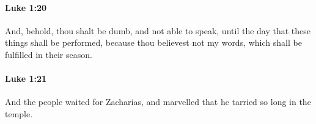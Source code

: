 		\paragraph{Luke 1:20} %
			\label{LUKE-1-20}

			And, behold, thou shalt be dumb, and not able to speak, until the day that these things shall be performed, because thou believest not my words, which shall be fulfilled in their season.

			\begin{framed}
			\scriptsize
				\begin{compactdesc}
					\item[SBLG] 
				\end{compactdesc}
			\end{framed}

		\paragraph{Luke 1:21} %
			\label{LUKE-1-21}

			And the people waited for Zacharias, and marvelled that he tarried so long in the temple.

